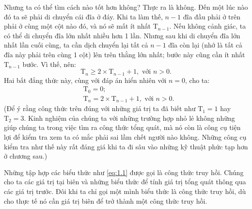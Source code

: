 
Nhưng ta có thể tìm cách nào tốt hơn không? Thực ra là không. Đến một lúc nào đó ta sẽ phải di chuyển cái đĩa ở đáy. Khi ta làm thế, $n - 1$ đĩa đầu phải ở trên phải ở cùng một cột nào đó, và nó sẽ mất ít nhất $\mathrm{T}_{n - 1}$. Nếu không cảnh giác, ta có thể di chuyển đĩa lớn nhất nhiều hơn 1 lần. Nhưng sau khi di chuyển đĩa lớn nhất lần cuối cùng, ta cần dịch chuyển lại tất cả $n - 1$ đĩa còn lại (nhớ là tất cả đĩa này phải trên cùng 1 cột) lên trên thằng lớn nhất; bước này cũng cần ít nhất $\mathrm{T}_{n - 1}$ bước. Vì thế, nên:
$$\mathrm{T}_n \ge 2 \times \mathrm{T}_{n - 1} + 1, \text{ \ \ \ \ với } n > 0.$$
Hai bất đẳng thức này, cùng với đáp án hiển nhiên với $n = 0$, cho ta:
\begin{equation}\label{eq:1.1}
    \begin{aligned}
        & \mathrm{T}_0 = 0; \\
        & \mathrm{T}_n = 2 \times \mathrm{T}_{n - 1} + 1, \text{ \ \ \ \ với } n > 0.
    \end{aligned}
\end{equation}
(Để ý rằng công thức trên đúng với những giá trị ta đã biết như $\mathrm{T}_1 = 1$ hay $\mathrm{T}_2 = 3$. Kinh nghiệm của chúng ta với những trường hợp nhỏ lẻ không những giúp chúng ta trong việc tìm ra công thức tổng quát, mà nó còn là công cụ tiện lợi để kiểm tra xem ta có mắc phải sai lầm chết người nào không. Những công cụ kiểm tra như thế này rất đáng giá khi ta đi sâu vào những kỹ thuật phức tạp hơn ở chương sau.)

Những tập hợp các biểu thức như \eqref{eq:1.1} được gọi là
công thức truy hồi. Chúng cho ta các giá trị tại biên và những biểu thức để tính giá trị tổng quát thông qua các giá trị trước. Đôi khi ta chỉ gọi một mình biểu thức là công thức truy hồi, dù cho thực tế nó cần giá trị biên để trở thành một công thức truy hồi. 

